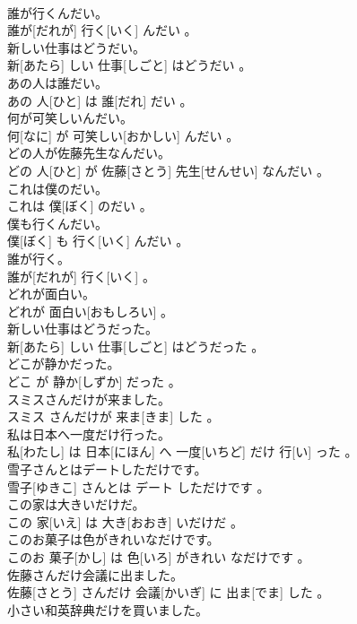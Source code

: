 \documentclass[8pt]{extreport}
\begin{document}
\begin{CJK}{UTF8}{min}
\\	誰が行くんだい。	
\\	誰が[だれが] 行く[いく] んだい 。
\\	新しい仕事はどうだい。	
\\	新[あたら] しい 仕事[しごと] はどうだい 。
\\	あの人は誰だい。	
\\	あの 人[ひと] は 誰[だれ] だい 。
\\	何が可笑しいんだい。	
\\	何[なに] が 可笑しい[おかしい] んだい 。
\\	どの人が佐藤先生なんだい。	
\\	どの 人[ひと] が 佐藤[さとう] 先生[せんせい] なんだい 。
\\	これは僕のだい。	
\\	これは 僕[ぼく] のだい 。
\\	僕も行くんだい。	
\\	僕[ぼく] も 行く[いく] んだい 。
\\	誰が行く。	
\\	誰が[だれが] 行く[いく] 。
\\	どれが面白い。	
\\	どれが 面白い[おもしろい] 。
\\	新しい仕事はどうだった。	
\\	新[あたら] しい 仕事[しごと] はどうだった 。
\\	どこが静かだった。	
\\	どこ が 静か[しずか] だった 。
\\	スミスさんだけが来ました。	
\\	スミス さんだけが 来ま[きま] した 。
\\	私は日本へ一度だけ行った。	
\\	私[わたし] は 日本[にほん] へ 一度[いちど] だけ 行[い] った 。
\\	雪子さんとはデートしただけです。	
\\	雪子[ゆきこ] さんとは デート しただけです 。
\\	この家は大きいだけだ。	
\\	この 家[いえ] は 大き[おおき] いだけだ 。
\\	このお菓子は色がきれいなだけです。	
\\	このお 菓子[かし] は 色[いろ] がきれい なだけです 。
\\	佐藤さんだけ会議に出ました。	
\\	佐藤[さとう] さんだけ 会議[かいぎ] に 出ま[でま] した 。
\\	小さい和英辞典だけを買いました。	

\end{CJK}
\end{document}
